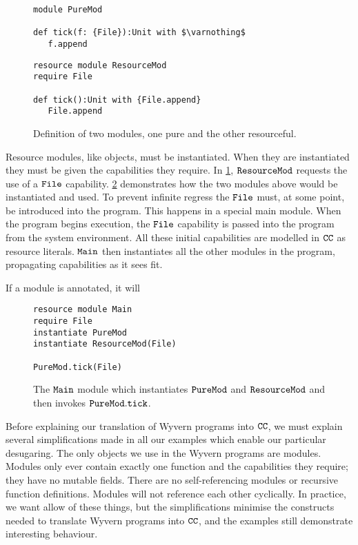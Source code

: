 \begin{figure}[h]

\begin{lstlisting}
module PureMod

def tick(f: {File}):Unit with $\varnothing$
   f.append

\end{lstlisting}

\begin{lstlisting}
resource module ResourceMod
require File

def tick():Unit with {File.append}
   File.append
\end{lstlisting}

\caption{Definition of two modules, one pure and the other resourceful.}
\label{fig:wyv_modules}
\end{figure}

Resource modules, like objects, must be instantiated. When they are instantiated they must be given the capabilities they require. In \ref{fig:wyv_modules}, $\mathtt{ResourceMod}$ requests the use of a $\mathtt{File}$ capability. \ref{fig:wyv_module_instantiation} demonstrates how the two modules above would be instantiated and used. To prevent infinite regress the $\mathtt{File}$ must, at some point, be introduced into the program. This happens in a special main module. When the program begins execution, the $\mathtt{File}$ capability is passed into the program from the system environment. All these initial capabilities are modelled in $\mathtt{CC}$ as resource literals. $\mathtt{Main}$ then instantiates all the other modules in the program, propagating capabilities as it sees fit.

If a module is annotated, it will 

\begin{figure}[h]

\begin{lstlisting}
resource module Main
require File
instantiate PureMod
instantiate ResourceMod(File)

PureMod.tick(File)
\end{lstlisting}

\caption{The $\mathtt{Main}$ module which instantiates $\mathtt{PureMod}$ and $\mathtt{ResourceMod}$ and then invokes $\mathtt{PureMod.tick}$.}
\label{fig:wyv_module_instantiation}
\end{figure}

Before explaining our translation of Wyvern programs into $\mathtt{CC}$, we must explain several simplifications made in all our examples which enable our particular desugaring. The only objects we use in the Wyvern programs are modules. Modules only ever contain exactly one function and the capabilities they require; they have no mutable fields. There are no self-referencing modules or recursive function definitions. Modules will not reference each other cyclically. In practice, we want allow of these things, but the simplifications minimise the constructs needed to translate Wyvern programs into $\mathtt{CC}$, and the examples still demonstrate interesting behaviour.

